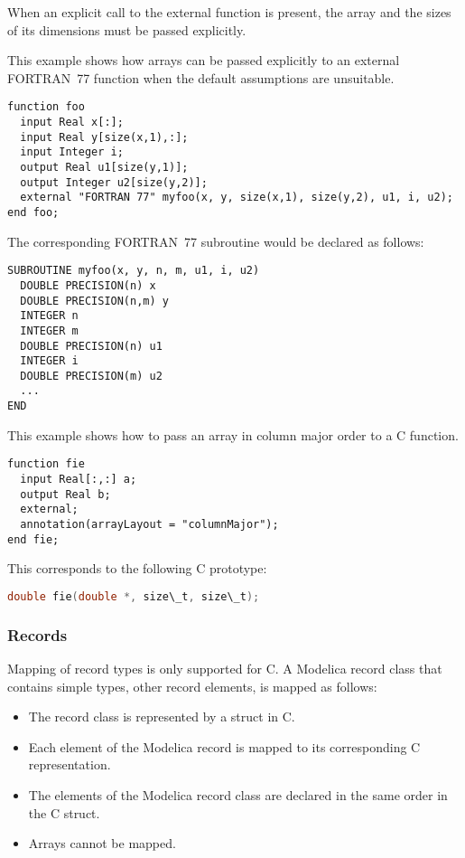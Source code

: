 When an explicit call to the external function is present, the array and
the sizes of its dimensions must be passed explicitly.

\begin{example}
This example shows how arrays can be passed explicitly to an
external FORTRAN~77 function when the default assumptions are
unsuitable.

\begin{lstlisting}[language=modelica]
function foo
  input Real x[:];
  input Real y[size(x,1),:];
  input Integer i;
  output Real u1[size(y,1)];
  output Integer u2[size(y,2)];
  external "FORTRAN 77" myfoo(x, y, size(x,1), size(y,2), u1, i, u2);
end foo;
\end{lstlisting}
The corresponding FORTRAN~77 subroutine would be declared as follows:
\begin{lstlisting}[language=fortran77]
SUBROUTINE myfoo(x, y, n, m, u1, i, u2)
  DOUBLE PRECISION(n) x
  DOUBLE PRECISION(n,m) y
  INTEGER n
  INTEGER m
  DOUBLE PRECISION(n) u1
  INTEGER i
  DOUBLE PRECISION(m) u2
  ...
END
\end{lstlisting}

This example shows how to pass an array in column major order to a C function.

\begin{lstlisting}[language=modelica]
function fie
  input Real[:,:] a;
  output Real b;
  external;
  annotation(arrayLayout = "columnMajor");
end fie;
\end{lstlisting}
This corresponds to the following C prototype:
\begin{lstlisting}[language=C]
double fie(double *, size\_t, size\_t);
\end{lstlisting}
\end{example}

\subsubsection{Records}\label{records}

Mapping of record types is only supported for C. A Modelica record class
that contains simple types, other record elements, is mapped as follows:
\begin{itemize}
\item
  The record class is represented by a struct in C.
\item
  Each element of the Modelica record is mapped to its corresponding C
  representation.
\item
  The elements of the Modelica record class are declared in the same
  order in the C struct.
\item
  Arrays cannot be mapped.
\end{itemize}

